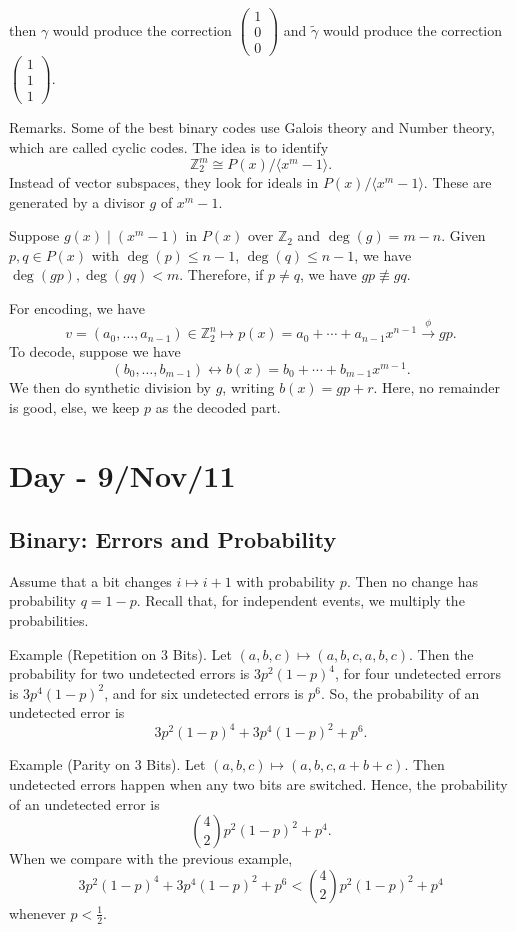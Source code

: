 \documentclass[12pt]{article}
\theoremstyle{definition}
\newcommand{\Z}{\mathbb{Z}}
\begin{document}
then $\gamma$ would produce the correction $\begin{pmatrix}1\\0\\0\end{pmatrix}$ and $\widetilde{\gamma}$ would produce the correction $\begin{pmatrix}1\\1\\1\end{pmatrix}$.

Remarks. Some of the best binary codes use Galois theory and Number theory, which are called cyclic codes. The idea is to identify
\[
\Z_2^m \cong P(x)/\langle x^m-1\rangle.
\]
Instead of vector subspaces, they look for ideals in $P(x)/\langle x^m-1\rangle$. These are generated by a divisor $g$ of $x^m-1$.

Suppose $g(x) \mid (x^m-1)$ in $P(x)$ over $\Z_2$ and $\deg(g)=m-n$. Given $p,q \in P(x)$ with $\deg(p) \leq n-1$, $\deg(q) \leq n-1$, we have $\deg(gp),\deg(gq)<m$. Therefore, if $p \neq q$, we have $gp \not\equiv gq$.

For encoding, we have
\[
v=(a_0,\ldots,a_{n-1}) \in \Z_2^n \mapsto p(x)=a_0+\cdots+a_{n-1}x^{n-1} \xrightarrow{\phi} gp.
\]
To decode, suppose we have
\[
(b_0,\ldots,b_{m-1}) \leftrightarrow b(x)=b_0+\cdots+b_{m-1}x^{m-1}.
\]
We then do synthetic division by $g$, writing $b(x)=gp+r$. Here, no remainder is good, else, we keep $p$ as the decoded part.

\section{Day - 9/Nov/11}

\subsection{Binary: Errors and Probability}

Assume that a bit changes $i \mapsto i+1$ with probability $p$. Then no change has probability $q=1-p$. Recall that, for independent events, we multiply the probabilities.

Example (Repetition on 3 Bits). Let $(a,b,c) \mapsto (a,b,c,a,b,c)$. Then the probability for two undetected errors is $3p^2(1-p)^4$, for four undetected errors is $3p^4(1-p)^2$, and for six undetected errors is $p^6$. So, the probability of an undetected error is
\[
3p^2(1-p)^4 + 3p^4(1-p)^2 + p^6.
\]

Example (Parity on 3 Bits). Let $(a,b,c) \mapsto (a,b,c,a+b+c)$. Then undetected errors happen when any two bits are switched. Hence, the probability of an undetected error is
\[
\binom{4}{2}p^2(1-p)^2 + p^4.
\]
When we compare with the previous example,
\[
3p^2(1-p)^4 + 3p^4(1-p)^2 + p^6 < \binom{4}{2}p^2(1-p)^2 + p^4
\]
whenever $p < \frac{1}{2}$.
\end{document}
